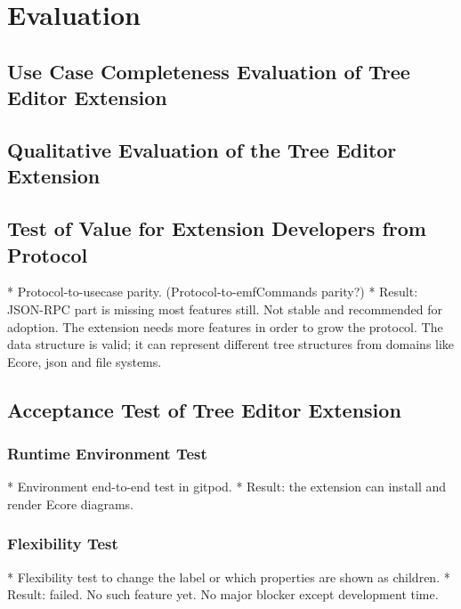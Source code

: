 \chapter{Evaluation}\label{chap:evaluation}

\section{Use Case Completeness Evaluation of Tree Editor Extension}




\section{Qualitative Evaluation of the Tree Editor Extension}




\section{Test of Value for Extension Developers from Protocol}
* Protocol-to-usecase parity. (Protocol-to-emfCommands parity?)
  * Result: JSON-RPC part is missing most features still. Not stable and recommended for adoption. The extension needs more features in order to grow the protocol. The data structure is valid; it can represent different tree structures from domains like Ecore, json and file systems.

\section{Acceptance Test of Tree Editor Extension}

\subsection{Runtime Environment Test}
* Environment end-to-end test in gitpod.
  * Result: the extension can install and render Ecore diagrams.

\subsection{Flexibility Test}
* Flexibility test to change the label or which properties are shown as children.
  * Result: failed. No such feature yet. No major blocker except development time.

